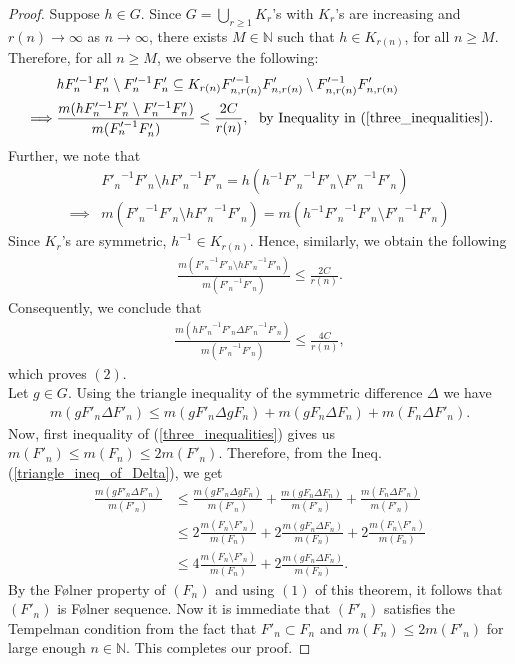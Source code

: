 \documentclass[11pt]{amsart}
\theoremstyle{definition}
\theoremstyle{myremark}
\numberwithin{equation}{section}
\def\N{\mathbb N}
\begin{document}
\begin{proof}
\medskip
\noindent
Suppose  $h\in G$. Since $G=\displaystyle\bigcup_{r\geq 1} K_r$'s with  $K_r$'s are increasing and $r(n) \to \infty$ as $n \to \infty$, there exists $M \in \N$ such that $h \in K_{r(n)}$, for all $n \geq M$. Therefore,  for all $n\geq M$, we observe the following: 
\begin{align*}
  &h{F'^{-1}_n}F'_n\setminus {F'^{-1}_n}F'_n \subseteq K_{r(n)}{F'^{-1}_{n,r(n)}}F'_{n,r(n)} \setminus {F'^{-1}_{n,r(n)}}F'_{n,r(n)}\\
  \implies & \frac{m(h{F'^{-1}_n}F'_n\setminus {F'^{-1}_n}F'_n)}{m({F'^{-1}_n}F'_n)} \leq \frac{2C}{r(n)}, ~~ \text{by Inequality in } (\ref{three_inequalities}).   
\end{align*}
Further, we note that 
\begin{align*}
 &{F'_n}^{-1}F'_n\setminus h{F'_n}^{-1}F'_n = h(h^{-1}{F'_n}^{-1}F'_n\setminus {F'_n}^{-1}F'_n)\\
 \implies & m({F'_n}^{-1}F'_n\setminus h{F'_n}^{-1}F'_n)=m(h^{-1}{F'_n}^{-1}F'_n\setminus {F'_n}^{-1}F'_n)   
\end{align*}
Since $K_r$'s are symmetric, $h^{-1} \in K_{r(n)}$. Hence, similarly, we obtain the following  
\begin{align*}
   \frac{ m({F'_n}^{-1}F'_n\setminus h{F'_n}^{-1}F'_n) }{m({F'_n}^{-1}F'_n)} \leq \frac{2C}{r(n)}.
\end{align*}
Consequently, we conclude that
\begin{align*}
    \frac{m(h{F'_n}^{-1}F'_n \Delta {F'_n}^{-1}F'_n)}{m({F'_n}^{-1}F'_n)} \leq \frac{4C}{r(n)},
\end{align*}
which proves $(2).$\\
Let $g\in G$. Using the triangle inequality of the symmetric difference $\Delta$ we have 
\begin{align}\label{triangle_ineq_of_Delta}
    m(gF'_n \Delta F'_n) \leq m(gF'_n \Delta gF_n) + m(gF_n \Delta F_n) + m(F_n \Delta F'_n).
\end{align}
Now, first inequality of (\ref{three_inequalities}) gives us $m(F'_n) \leq m(F_n) \leq 2m(F'_n)$.
Therefore, from the Ineq.(\ref{triangle_ineq_of_Delta}), we get
\begin{align*}
 \frac{m(gF'_n \Delta F'_n)}{m(F'_n)} &\leq \frac{m(gF'_n \Delta gF_n)}{m(F'_n)} + \frac{m(gF_n \Delta F_n)}{m(F'_n)}+ \frac{m(F_n \Delta F'_n)}{m(F'_n)}\\
 &\leq 2\frac{m(F_n \setminus F'_n)}{m(F_n)}+2\frac{m(gF_n \Delta F_n)}{m(F_n)} + 2\frac{m(F_n \setminus F'_n)}{m(F_n)}\\
 &\leq 4\frac{m(F_n \setminus F'_n)}{m(F_n)} + 2\frac{m(gF_n \Delta F_n)}{m(F_n)}.
\end{align*}
By the F\o lner property of $(F_n)$ and using $(1)$ of this theorem,   it follows that 
$(F'_n)$ is F\o lner sequence. Now it is immediate that $(F'_n)$ satisfies the Tempelman condition from the fact that $F'_n \subset F_n$ and $m(F_n) \leq 2m(F'_n)$ for large enough $n \in \N.$ This completes our proof.  
\end{proof}
\end{document}
